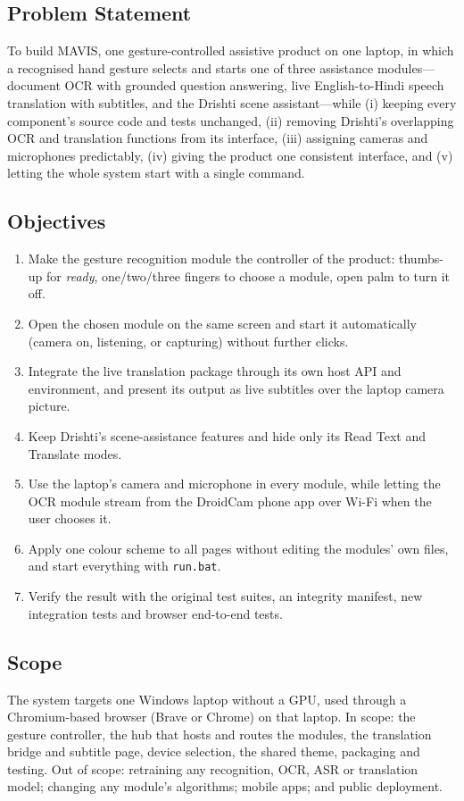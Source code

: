 \documentclass[12pt,singleside,a4paper]{article}
\begin{document}
\subsection{Problem Statement}
To build MAVIS, one gesture-controlled assistive product on one laptop, in which a recognised hand gesture selects and starts one of three assistance modules---document OCR with grounded question answering, live English-to-Hindi speech translation with subtitles, and the Drishti scene assistant---while (i) keeping every component's source code and tests unchanged, (ii) removing Drishti's overlapping OCR and translation functions from its interface, (iii) assigning cameras and microphones predictably, (iv) giving the product one consistent interface, and (v) letting the whole system start with a single command.

\subsection{Objectives}
\begin{enumerate}[leftmargin=*]
\item Make the gesture recognition module the controller of the product: thumbs-up for \emph{ready}, one/two/three fingers to choose a module, open palm to turn it off.
\item Open the chosen module on the same screen and start it automatically (camera on, listening, or capturing) without further clicks.
\item Integrate the live translation package through its own host API and environment, and present its output as live subtitles over the laptop camera picture.
\item Keep Drishti's scene-assistance features and hide only its Read Text and Translate modes.
\item Use the laptop's camera and microphone in every module, while letting the OCR module stream from the DroidCam phone app over Wi-Fi when the user chooses it.
\item Apply one colour scheme to all pages without editing the modules' own files, and start everything with \texttt{run.bat}.
\item Verify the result with the original test suites, an integrity manifest, new integration tests and browser end-to-end tests.
\end{enumerate}

\subsection{Scope}
The system targets one Windows laptop without a GPU, used through a Chromium-based browser (Brave or Chrome) on that laptop. In scope: the gesture controller, the hub that hosts and routes the modules, the translation bridge and subtitle page, device selection, the shared theme, packaging and testing. Out of scope: retraining any recognition, OCR, ASR or translation model; changing any module's algorithms; mobile apps; and public deployment.
\end{document}
